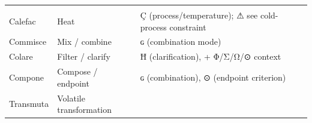 \begin{longtable}[]{@{}lll@{}}
\begin{minipage}[t]{0.30\columnwidth}
\end{minipage}\tabularnewline
\begin{minipage}[t]{0.30\columnwidth}\raggedright
Calefac\strut
\end{minipage} & \begin{minipage}[t]{0.30\columnwidth}\raggedright
Heat\strut
\end{minipage} & \begin{minipage}[t]{0.30\columnwidth}\raggedright
Ç (process/temperature); ⚠ see cold-process constraint\strut
\end{minipage}\tabularnewline
\begin{minipage}[t]{0.30\columnwidth}\raggedright
Commisce\strut
\end{minipage} & \begin{minipage}[t]{0.30\columnwidth}\raggedright
Mix / combine\strut
\end{minipage} & \begin{minipage}[t]{0.30\columnwidth}\raggedright
ɢ (combination mode)\strut
\end{minipage}\tabularnewline
\begin{minipage}[t]{0.30\columnwidth}\raggedright
Colare\strut
\end{minipage} & \begin{minipage}[t]{0.30\columnwidth}\raggedright
Filter / clarify\strut
\end{minipage} & \begin{minipage}[t]{0.30\columnwidth}\raggedright
Ħ (clarification), + Φ/Σ/Ω/⊙ context\strut
\end{minipage}\tabularnewline
\begin{minipage}[t]{0.30\columnwidth}\raggedright
Compone\strut
\end{minipage} & \begin{minipage}[t]{0.30\columnwidth}\raggedright
Compose / endpoint\strut
\end{minipage} & \begin{minipage}[t]{0.30\columnwidth}\raggedright
ɢ (combination), ⊙ (endpoint criterion)\strut
\end{minipage}\tabularnewline
\begin{minipage}[t]{0.30\columnwidth}\raggedright
Transmuta\strut
\end{minipage} & \begin{minipage}[t]{0.30\columnwidth}\raggedright
Volatile transformation\strut
\end{minipage} & \begin{minipage}[t]{0.30\columnwidth}\raggedright

\end{minipage}
\end{longtable}

